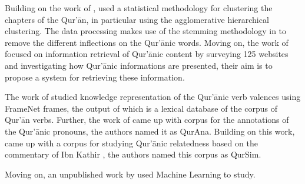 Building on the work of ,  used a statistical methodology for clustering the chapters of the Qur'\=an, in particular using the agglomerative hierarchical clustering. The data processing makes use of the stemming methodology in  to remove the different inflections on the Qur'\=anic words. Moving on, the work of  focused on information retrieval of Qur'\=anic content by surveying 125 websites and investigating how Qur'\=anic informations are presented, their aim is to propose a system for retrieving these information.

The work of  studied knowledge representation of the Qur'\=anic verb valences using FrameNet frames, the output of which is a lexical database of the corpus of Qur'\=an verbs. Further, the work of  came up with corpus for the annotations of the Qur'\=anic pronouns, the authors named it as QurAna. Building on this work,  came up with a corpus for studying Qur'\=anic relatedness based on the commentary of Ibn Kathir , the authors named this corpus as QurSim.

Moving on, an unpublished work by  used Machine Learning to study.
